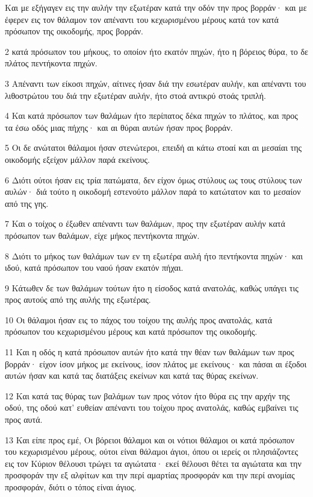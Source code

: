 \par Και με εξήγαγεν εις την αυλήν την εξωτέραν κατά την οδόν την προς βορράν· και με έφερεν εις τον θάλαμον τον απέναντι του κεχωρισμένου μέρους κατά τον κατά πρόσωπον της οικοδομής, προς βορράν.
\par 2 κατά πρόσωπον του μήκους, το οποίον ήτο εκατόν πηχών, ήτο η βόρειος θύρα, το δε πλάτος πεντήκοντα πηχών.
\par 3 Απέναντι των είκοσι πηχών, αίτινες ήσαν διά την εσωτέραν αυλήν, και απέναντι του λιθοστρώτου του διά την εξωτέραν αυλήν, ήτο στοά αντικρύ στοάς τριπλή.
\par 4 Και κατά πρόσωπον των θαλάμων ήτο περίπατος δέκα πηχών το πλάτος, και προς τα έσω οδός μιας πήχης· και αι θύραι αυτών ήσαν προς βορράν.
\par 5 Οι δε ανώτατοι θάλαμοι ήσαν στενώτεροι, επειδή αι κάτω στοαί και αι μεσαίαι της οικοδομής εξείχον μάλλον παρά εκείνους.
\par 6 Διότι ούτοι ήσαν εις τρία πατώματα, δεν είχον όμως στύλους ως τους στύλους των αυλών· διά τούτο η οικοδομή εστενούτο μάλλον παρά το κατώτατον και το μεσαίον από της γης.
\par 7 Και ο τοίχος ο έξωθεν απέναντι των θαλάμων, προς την εξωτέραν αυλήν κατά πρόσωπον των θαλάμων, είχε μήκος πεντήκοντα πηχών.
\par 8 Διότι το μήκος των θαλάμων των εν τη εξωτέρα αυλή ήτο πεντήκοντα πηχών· και ιδού, κατά πρόσωπον του ναού ήσαν εκατόν πήχαι.
\par 9 Κάτωθεν δε των θαλάμων τούτων ήτο η είσοδος κατά ανατολάς, καθώς υπάγει τις προς αυτούς από της αυλής της εξωτέρας.
\par 10 Οι θάλαμοι ήσαν εις το πάχος του τοίχου της αυλής προς ανατολάς, κατά πρόσωπον του κεχωρισμένου μέρους και κατά πρόσωπον της οικοδομής.
\par 11 Και η οδός η κατά πρόσωπον αυτών ήτο κατά την θέαν των θαλάμων των προς βορράν· είχον ίσον μήκος με εκείνους, ίσον πλάτος με εκείνους· και πάσαι αι έξοδοι αυτών ήσαν και κατά τας διατάξεις εκείνων και κατά τας θύρας εκείνων.
\par 12 Και κατά τας θύρας των βαλάμων των προς νότον ήτο θύρα εις την αρχήν της οδού, της οδού κατ' ευθείαν απέναντι του τοίχου προς ανατολάς, καθώς εμβαίνει τις προς αυτά.
\par 13 Και είπε προς εμέ, Οι βόρειοι θάλαμοι και οι νότιοι θάλαμοι οι κατά πρόσωπον του κεχωρισμένου μέρους, ούτοι είναι θάλαμοι άγιοι, όπου οι ιερείς οι πλησιάζοντες εις τον Κύριον θέλουσι τρώγει τα αγιώτατα· εκεί θέλουσι θέτει τα αγιώτατα και την προσφοράν την εξ αλφίτων και την περί αμαρτίας προσφοράν και την περί ανομίας προσφοράν, διότι ο τόπος είναι άγιος.

